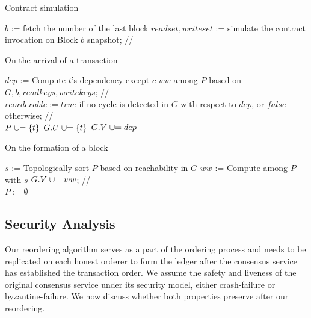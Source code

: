 {%
\begin{algorithm}
  \caption{Contract simulation}
  \label{alg:txn:simulation}
  $b$ := fetch the number of the last block\;
  $readset, writeset$ := simulate the contract invocation on Block $b$
  snapshot; \hfill {// }
\end{algorithm}


\begin{algorithm}[tp]
  \caption{On the arrival of a transaction}
  \label{alg:txn:txn}
  $dep$ := Compute $t$'s dependency except $c$-$ww$ among $P$ based on $G, b, readkeys,
  writekeys$; \hfill {// }\\
  $reorderable := true$ if no cycle is detected in $G$ with respect to $dep$,
  or $false$ otherwise;
  \hfill {// }\\
   {
    $P \mathrel{{\cup}{=}} \{t\}$\;
    $G.U \mathrel{{\cup}{=}} \{t\}$\;
    $G.V \mathrel{{\cup}{=}} dep$\;
  }
\end{algorithm}

\begin{algorithm}
  \caption{On the formation of a block}
  \label{alg:txn:blk}
  $s$ := Topologically sort $P$ based on reachability in $G$\;
  $ww$ := Compute  among $P$ with $s$\;
  $G.V \mathrel{{\cup}{=}} ww$;  \hfill {// } \\
  $P := \emptyset$
\end{algorithm}

\subsection{Security Analysis}
\label{sec:txn:securityanalysis}
Our reordering algorithm serves as a part of the ordering process and needs to be replicated on each honest orderer to form the ledger after the consensus service has established the transaction order. 
%
We assume the safety and liveness of the original consensus service under its security model, either crash-failure or byzantine-failure.
%
We now discuss whether both properties preserve after our reordering. 

}
